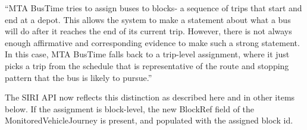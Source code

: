 \documentclass[12pt,journal,compsoc]{IEEEtran}
\begin{document}
“MTA BusTime tries to assign buses to blocks- a sequence of trips that start and end at a depot.  This allows the system to make a statement about what a bus will do after it reaches the end of its current trip.   However, there is not always enough affirmative and corresponding evidence to make such a strong statement.  In this case, MTA BusTime falls back to a trip-level assignment, where it just picks a trip from the schedule that is representative of the route and stopping pattern that the bus is likely to pursue.”

The SIRI API now reflects this distinction as described here and in other items below.  If the assignment is block-level, the new BlockRef field of the MonitoredVehicleJourney is present, and populated with the assigned block id.

\vspace{0.5 cm}

\end{document}
